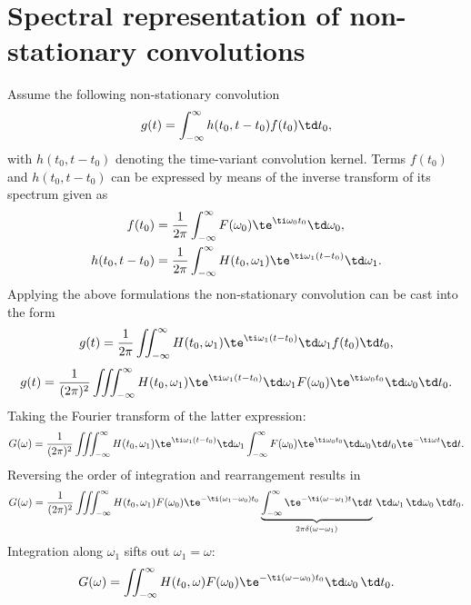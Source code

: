 \section{Spectral representation of non-stationary convolutions}
\label{Sec:Non_stat_conv}

Assume the following non-stationary convolution
\begin{equation}
g(t) = \int_{-\infty}^{\infty} h(t_0,t-t_0) f(t_0) \td t_0,
\label{Eq:App:Non_stat_conv_td}
\end{equation}
with $h(t_0,t-t_0)$ denoting the time-variant convolution kernel.
Terms $f(t_0)$ and $h(t_0,t-t_0)$ can be expressed by means of the inverse transform of its spectrum given as
\begin{align}
f(t_0) &= \frac{1}{2\pi} \int_{-\infty}^{\infty} F(\omega_0) \te^{\ti \omega_0 t_0}\td \omega_0,
\\
h(t_0,t-t_0) &= \frac{1}{2\pi}\int_{-\infty}^{\infty} H(t_0,\omega_1) \te^{\ti \omega_1(t-t_0)} \td \omega_1.
\end{align}
Applying the above formulations the non-stationary convolution can be cast into the form
\begin{equation}
g(t) = \frac{1}{2\pi} \iint_{-\infty}^{\infty}  H(t_0,\omega_1) \te^{\ti \omega_1(t-t_0)} \td \omega_1 f(t_0) \td t_0,
\end{equation}
\begin{equation}
g(t) = \frac{1}{(2\pi)^2} \iiint_{-\infty}^{\infty}  H(t_0,\omega_1) \te^{\ti \omega_1(t-t_0)} \td \omega_1  F(\omega_0) \te^{\ti \omega_0 t_0}\td \omega_0 \td t_0.
\end{equation}
Taking the Fourier transform of the latter expression:
\begin{equation}
G(\omega) =\frac{1}{(2\pi)^2} \iiint_{-\infty}^{\infty} H(t_0,\omega_1) \te^{\ti \omega_1(t-t_0)} \td \omega_1 \int_{-\infty}^{\infty} F(\omega_0) \te^{\ti \omega_0 t_0}\td \omega_0 \td t_0 \te^{-\ti \omega t} \td t.
\end{equation}
Reversing the order of integration and rearrangement results in
\begin{equation}
G(\omega) =\frac{1}{(2\pi)^2} \iiint_{-\infty}^{\infty} H(t_0,\omega_1) F(\omega_0)  \te^{-\ti (\omega_1-\omega_0) t_0}  
\underbrace{ \int_{-\infty}^{\infty}  \te^{-\ti (\omega-\omega_1) t}  \td t}_{2\pi \delta(\omega-\omega_1)}
 \, \td \omega_1 \,  \td \omega_0 \, \td t_0.
\end{equation}
Integration along $\omega_1$ sifts out $\omega_1 = \omega$:
\begin{equation}
G(\omega) =  \iint_{-\infty}^{\infty} H(t_0,\omega) F(\omega_0)  \te^{-\ti (\omega-\omega_0) t_0}   \td \omega_0 \, \td t_0.
\end{equation}
